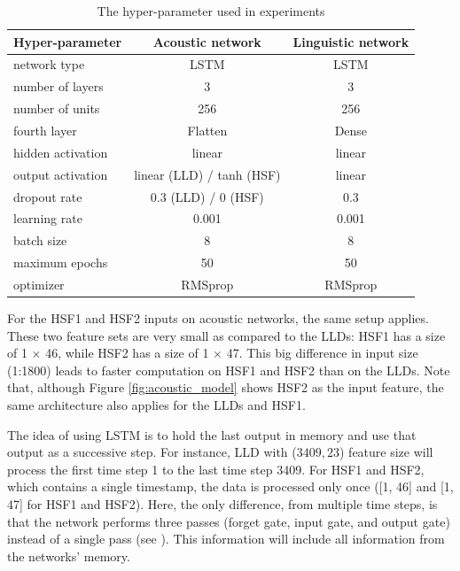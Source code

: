 \begin{table}
    \caption{The hyper-parameter used in experiments}
    \begin{center}
        \begin{tabular}{l| c c}
            \hline
Hyper-parameter  &  Acoustic network    & Linguistic network \\
\hline \hline
network type        &   LSTM            &   LSTM \\
number of layers    &   3               &   3 \\
number of units     &   256             &   256 \\
fourth layer        &   Flatten         &   Dense \\
hidden activation   &   linear          &   linear \\
output activation   & linear (LLD) / tanh (HSF)   &   linear \\
dropout rate        & 0.3 (LLD) / 0 (HSF)&   0.3 \\
learning rate       &   0.001           &   0.001  \\
batch size          &   8               &   8  \\
maximum epochs      &   50              &   50 \\
optimizer           &   RMSprop         &   RMSprop \\
            \hline
        \end{tabular}
    \end{center}
    \label{tab:dnn_params}
\end{table}

For the HSF1 and HSF2 inputs on acoustic networks, the same setup applies.
These two feature sets are very small as compared to the LLDs: HSF1 has a size
of 1 $\times$ 46, while HSF2 has a size of 1 $\times$ 47. This big difference
in input size (1:1800) leads to faster computation on HSF1 and HSF2 than on the
LLDs. Note that, although Figure \ref{fig:acoustic_model} shows HSF2 as the
input feature, the same architecture also applies for the LLDs and HSF1.

The idea of using LSTM is to hold the last output in memory and use that output
as a successive step. For instance, LLD with ($3409, 23$) feature size will
process the first time step 1 to the last time step 3409. For HSF1 and HSF2,
which contains a single timestamp, the data is processed only once ([1, 46] and
[1, 47] for HSF1 and HSF2). Here, the only difference, from multiple time
steps, is that the network performs three passes (forget gate, input gate, and
output gate) instead of a single pass (see \cite{Eyben2010}). This information
will include all information from the networks' memory.


